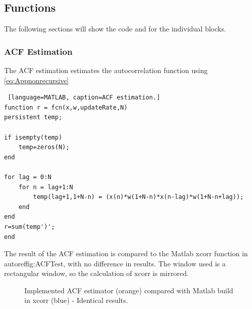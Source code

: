 \subsection{Functions}
The following sections will show the code and for the individual blocks. 



\subsubsection{ACF Estimation}
The ACF estimation estimates the autocorrelation function using \autoref{eq:Appnonrecursive}
\begin{lstlisting} [language=MATLAB, caption=ACF estimation.]
function r = fcn(x,w,updateRate,N)
persistent temp;

if isempty(temp)
	temp=zeros(N);
end

for lag = 0:N
	for n = lag+1:N
		temp(lag+1,1+N-n) = (x(n)*w(1+N-n)*x(n-lag)*w(1+N-n+lag));
	end
end
r=sum(temp')';
end
\end{lstlisting}

The result of the ACF estimation is compared to the Matlab xcorr function in autoref{fig:ACFTest}, with no difference in results. The window used is a rectangular window, so the calculation of xcorr is mirrored.  
\begin{figure}[H]
	\centering
	
	\caption{Implemented ACF estimator (orange) compared with Matlab build in xcorr (blue) - Identical results.}
	\label{fig:ACFTest}
\end{figure}
 

